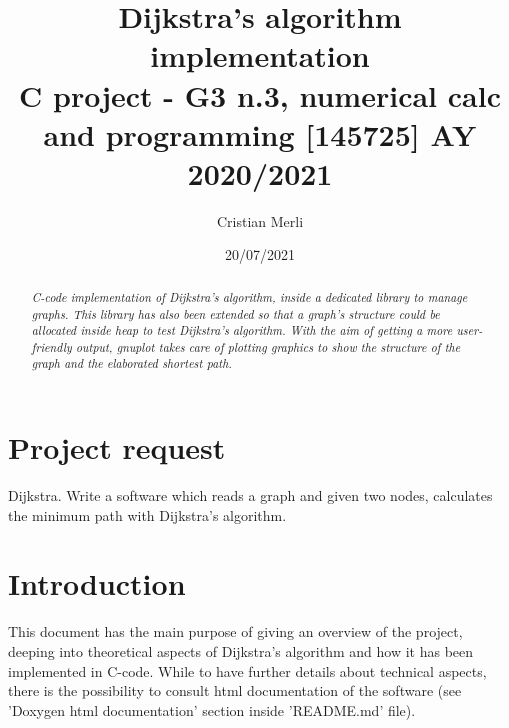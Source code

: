\documentclass{article}                                                                                                     %
\title{Dijkstra's algorithm implementation \\                                                                               %
\large C project - G3 n.3, numerical calc and programming [145725] AY 2020/2021}                                            %
\author{Cristian Merli}                                                                                                     %
\date{20/07/2021}                                                                                                           %
\begin{document}

\maketitle                                                                                                                  %

\begin{abstract}                                                                                                            %
  \noindent \textit{C-code implementation of Dijkstra's algorithm, inside a dedicated library to manage graphs.             %
  This library has also been extended so that a graph's structure could be allocated inside heap to test
  Dijkstra’s algorithm. With the aim of getting a more user-friendly output, gnuplot takes care of plotting graphics
  to show the structure of the graph and the elaborated shortest path.}
\end{abstract}                                                                                                              %

\vspace{1cm}                                                                                                                %

\section{Project request}                                                                                                   %
  Dijkstra. Write a software which reads a graph and given two nodes, calculates the minimum path with Dijkstra’s           %
  algorithm.
\label{sec:project_request}                                                                                                 %

\section{Introduction}                                                                                                      %
  This document has the main purpose of giving an overview of the project, deeping into theoretical aspects of              %
  Dijkstra's algorithm and how it has been implemented in C-code. While to have further details about technical
  aspects, there is the possibility to consult html documentation of the software (see 'Doxygen html documentation'
  section inside 'README.md' file).
\label{sec:introduction}                                                                                                    %
\end{document}
